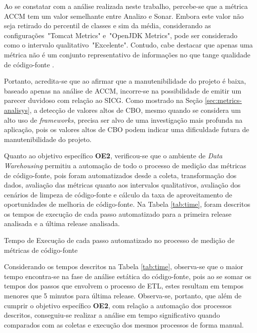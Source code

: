Ao se constatar com a análise realizada neste trabalho, percebe-se que a métrica ACCM tem um valor semelhante entre Analizo e Sonar. Embora este valor não seja retirado do percentil de classes e sim da média, considerando as configurações~"Tomcat Metrics" e~"OpenJDK Metrics", pode ser considerado como o intervalo qualitativo~"Excelente". Contudo, cabe destacar que apenas uma métrica não é um conjunto representativo de informações no que tange qualidade de código-fonte \cite{Meirelles2013}.


Portanto, acredita-se que ao afirmar que a manutenibilidade do projeto é baixa, baseado apenas na análise de ACCM, incorre-se na possibilidade de emitir um parecer duvidoso com relação ao SICG. Como mostrado na Seção \ref{sec:metrics-analisys}, a detecção de valores altos de CBO, mesmo quando se considera um alto uso de \textit{frameworks}, precisa ser alvo de uma investigação mais profunda na aplicação, pois os valores altos de CBO podem indicar uma dificuldade futura de manutenibilidade do projeto.

Quanto ao objetivo específico \textbf{OE2}, verificou-se que o ambiente de \textit{Data Warehousing} permitiu a automação de todo o processo de medição das métricas de código-fonte, pois foram automatizados desde a coleta, transformação dos dados, avaliação das métricas quanto aos intervalos qualitativos, avaliação dos cenários de limpeza de código-fonte e cálculo da taxa de aproveitamento de oportunidades de melhoria de código-fonte. Na Tabela \ref{tab:time}, foram descritos os tempos de execução de cada passo automatizado para a primeira release analisada e a última release analisada.

\begin{table}[!ht]
\centering

\caption{Tempo de Execução de cada passo automatizado no processo de medição de métricas de código-fonte}
\label{tab:time}
\end{table}
\FloatBarrier

Considerando os tempos descritos na Tabela \ref{tab:time}, observa-se que o maior tempo encontra-se na fase de análise estática do código-fonte, pois ao se somar os tempos dos passos que envolvem o processo de ETL, estes resultam em tempos menores que 5 minutos para última release. Observa-se, portanto, que além de cumprir o objetivo específico \textbf{OE2}, com relação a automação dos processos descritos, conseguiu-se realizar a análise em tempo significativo quando comparados com as coletas e execução dos mesmos processos de forma manual.

